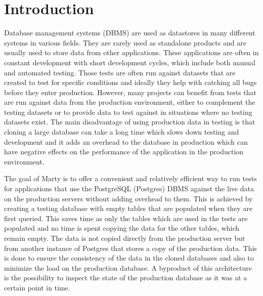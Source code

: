 \chapter{Introduction}
\setcounter{page}{1}
Database management systems (DBMS) are used as datastores in many different systems in various fields.
They are rarely used as standalone products and are usually used to store data from other applications.
These applications are often in constant development with short development cycles, which include both manual and automated testing.
Those  tests are often run against datasets that are created to test for specific conditions and ideally they help with catching all bugs before they enter production. However, many projects can benefit from tests that are run against data from the production environment, either to complement the testing datasets or to provide data to test against in situations where no testing datasets exist.
The main disadvantage of using production data in testing is that cloning a large database can take a long time which slows down testing and development and it adds an overhead to the database in production which can have negative effects on the performance of the application in the production environment.

The goal of Marty is to offer a convenient and relatively efficient way to run tests for applications that use the PostgreSQL (Postgres) DBMS against the live data on the production servers without adding overhead to them.
This is achieved by creating a testing database with empty tables that are populated  when they are first queried.
This saves time as only the tables which are used in the tests are populated and no time is spent copying the data for the other tables, which remain empty.
The data is not copied directly from the production server but from another instance of Postgres that stores a copy of the production data.
This is done to ensure the consistency of the data in the cloned databases and also to minimize the load on the production database.
A byproduct of this architecture is the possibility to inspect the state of the production database as it was at a certain point in time.

